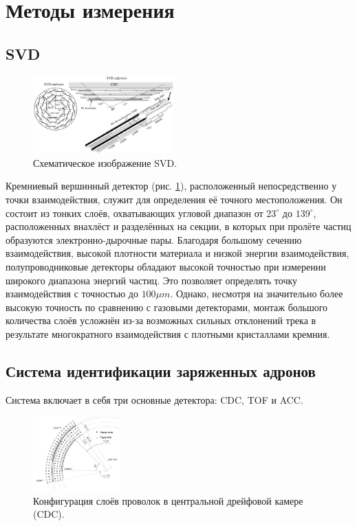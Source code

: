 \section{Методы измерения}
\label{mes_mthods}
\subsection{SVD}

\begin{figure}
    \centering
    \includegraphics[width=0.48\textwidth]{img/SVD.png}
    \caption{Схематическое изображение SVD.}
    \label{the:SVD}
\end{figure}

Кремниевый вершинный детектор (рис. \ref{the:SVD}), расположенный непосредственно у точки взаимодействия, 
служит для определения её точного местоположения. Он состоит из тонких слоёв, охватывающих угловой диапазон от $23^\circ$ до $139^\circ$, 
расположенных внахлёст и разделённых на секции, в которых при пролёте частиц 
образуются электронно-дырочные пары. Благодаря большому сечению взаимодействия, 
высокой плотности материала и низкой энергии взаимодействия, полупроводниковые 
детекторы обладают высокой точностью при измерении широкого диапазона энергий частиц.
Это позволяет определять точку взаимодействия с точностью до $100\mu m$. 
Однако, несмотря на значительно более высокую точность по сравнению с газовыми детекторами, 
монтаж большого количества слоёв усложнён из-за возможных сильных отклонений 
трека в результате многократного взаимодействия с плотными кристаллами кремния.

\subsection{Система идентификации заряженных адронов}

Система включает в себя три основные детектора: CDC, TOF и ACC.

\begin{figure}
    \centering
    \includegraphics[width=0.3\textwidth]{img/CDC.png}
    \caption{Конфигурация слоёв проволок в центральной дрейфовой камере (CDC).}
    \label{the:CDC}
\end{figure}

